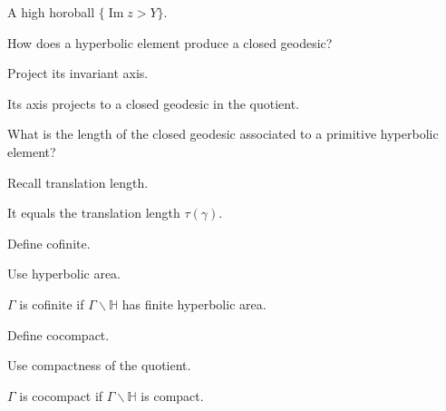 \begin{solution}
A high horoball \(\{\operatorname{Im}z>Y\}\).
\end{solution}

\begin{exercise}\label{exr:vii35-18}
How does a hyperbolic element produce a closed geodesic?
\end{exercise}

\begin{hint}
Project its invariant axis.
\end{hint}

\begin{solution}
Its axis projects to a closed geodesic in the quotient.
\end{solution}

\begin{exercise}\label{exr:vii35-19}
What is the length of the closed geodesic associated to a primitive hyperbolic element?
\end{exercise}

\begin{hint}
Recall translation length.
\end{hint}

\begin{solution}
It equals the translation length \(\tau(\gamma)\).
\end{solution}

\begin{exercise}\label{exr:vii35-20}
Define cofinite.
\end{exercise}

\begin{hint}
Use hyperbolic area.
\end{hint}

\begin{solution}
\(\Gamma\) is cofinite if \(\Gamma\backslash\mathbb H\) has finite hyperbolic area.
\end{solution}

\begin{exercise}\label{exr:vii35-21}
Define cocompact.
\end{exercise}

\begin{hint}
Use compactness of the quotient.
\end{hint}

\begin{solution}
\(\Gamma\) is cocompact if \(\Gamma\backslash\mathbb H\) is compact.
\end{solution}

